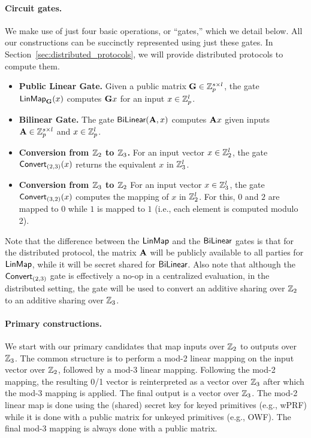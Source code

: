 \paragraph{Circuit gates.}
We make use of just four basic operations, or ``gates,'' which we detail below. All our constructions can be succinctly represented using just these gates. In Section~\ref{sec:distributed_protocols}, we will provide distributed protocols to compute them.

\begin{itemize}
    \item \textbf{Public Linear Gate.} 
    Given a public matrix $\mat{G} \in \Z_p^{s \times l}$, the gate $\LinMap_\mat{G}(x)$ computes $\mat{G}x$ for an input $x \in \mathbb{Z}_p^l$. 

    \item \textbf{Bilinear Gate.}
    The gate $\BiLinear(\mat{A}, x)$ computes $\mat{A}x$ given inputs $\mat{A} \in \Z_p^{s \times l}$ and $x \in \mathbb{Z}_p^l$. 
    
    \item \textbf{Conversion from $\mathbb{Z}_2$ to $\mathbb{Z}_3$.}
    For an input vector $x \in \mathbb{Z}_2^l$, the gate $\textsf{Convert}_{(2,3)}(x)$ returns the equivalent $x$ in $\mathbb{Z}_3^l$.

    \item \textbf{Conversion from $\mathbb{Z}_3$ to $\mathbb{Z}_2$}
    For an input vector $x \in \mathbb{Z}_3^l$, the gate $\textsf{Convert}_{(3,2)}(x)$ computes the mapping of $x$ in $\mathbb{Z}_2^l$. For this, $0$ and $2$ are mapped to $0$ while $1$ is mapped to $1$ (i.e., each element is computed modulo 2).
\end{itemize}

\noindent Note that the difference between the $\textsf{LinMap}$ and the $\textsf{BiLinear}$ gates is that for the distributed protocol, the matrix $\mat{A}$ will be publicly available to all parties for $\textsf{LinMap}$, while it will be secret shared for $\textsf{BiLinear}$. Also note that although the $\textsf{Convert}_{(2,3)}$ gate is effectively a no-op in a centralized evaluation, in the distributed setting, the gate will be used to convert an additive sharing over $\mathbb{Z}_2$ to an additive sharing over $\mathbb{Z}_3$.

\paragraph{Primary constructions.}
We start with our primary candidates that map inputs over $\mathbb{Z}_2$ to outputs over $\mathbb{Z}_3$. The common structure is to perform a mod-2 linear mapping on the input vector over $\mathbb{Z}_2$, followed by a mod-3 linear mapping. Following the mod-2 mapping, the resulting 0/1 vector is reinterpreted as a vector over $\mathbb{Z}_3$ after which the mod-3 mapping is applied. The final output is a vector over $\mathbb{Z}_3$. The mod-2 linear map is done using the (shared) secret key for keyed primitives (e.g., wPRF) while it is done with a public matrix for unkeyed primitives (e.g., OWF). The final mod-3 mapping is always done with a public matrix.

